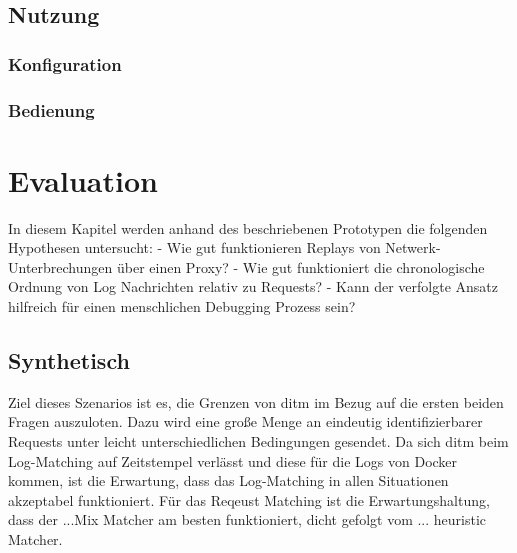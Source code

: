 \documentclass[12pt,a4paper]{report}
\begin{document}
\section{Nutzung}
\subsection{Konfiguration}
\subsection{Bedienung}

\chapter{Evaluation}
In diesem Kapitel werden anhand des beschriebenen Prototypen die folgenden Hypothesen untersucht:
- Wie gut funktionieren Replays von Netwerk-Unterbrechungen über einen Proxy?
- Wie gut funktioniert die chronologische Ordnung von Log Nachrichten relativ zu Requests?
- Kann der verfolgte Ansatz hilfreich für einen menschlichen Debugging Prozess sein?
\section{Synthetisch}
Ziel dieses Szenarios ist es, die Grenzen von ditm im Bezug auf die ersten beiden Fragen auszuloten.
Dazu wird eine große Menge an eindeutig identifizierbarer Requests unter leicht unterschiedlichen Bedingungen gesendet.
Da sich ditm beim Log-Matching auf Zeitstempel verlässt und diese für die Logs von Docker kommen, ist die Erwartung,
dass das Log-Matching in allen Situationen akzeptabel funktioniert. Für das Reqeust Matching ist die Erwartungshaltung, dass
der ...Mix Matcher am besten funktioniert, dicht gefolgt vom ... heuristic Matcher.
\end{document}
